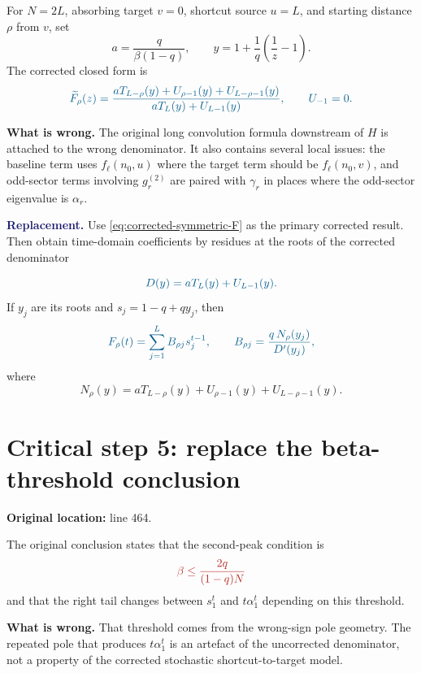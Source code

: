 \documentclass[11pt]{article}
\newcommand{\wt}{\widetilde}
\newcommand{\Original}[1]{\textcolor{BrickRed}{#1}}
\newcommand{\Corrected}[1]{\textcolor{MidnightBlue}{#1}}
\newcommand{\Issue}[1]{\par\smallskip\noindent\textbf{\textcolor{BrickRed}{What is wrong.}} #1\par}
\newcommand{\Fix}[1]{\par\smallskip\noindent\textbf{\textcolor{MidnightBlue}{Replacement.}} #1\par}
\begin{document}
For $N=2L$, absorbing target $v=0$, shortcut source $u=L$, and starting
distance $\rho$ from $v$, set
\[
  a=\frac{q}{\beta(1-q)},
  \qquad
  y=1+\frac{1}{q}\left(\frac1z-1\right).
\]
The corrected closed form is
\begin{equation}
  \Corrected{
  \wt F_\rho(z)=
  \frac{aT_{L-\rho}(y)+U_{\rho-1}(y)+U_{L-\rho-1}(y)}
  {aT_L(y)+U_{L-1}(y)},\qquad U_{-1}=0.}
  \label{eq:corrected-symmetric-F}
\end{equation}

\Issue{The original long convolution formula downstream of $H$ is attached to
the wrong denominator.  It also contains several local issues: the baseline
term uses $f_\ell(n_0,u)$ where the target term should be
$f_\ell(n_0,v)$, and odd-sector terms involving $g^{(2)}_r$ are paired with
$\gamma_r$ in places where the odd-sector eigenvalue is $\alpha_r$.}

\Fix{Use \eqref{eq:corrected-symmetric-F} as the primary corrected result.
Then obtain time-domain coefficients by residues at the roots of the corrected
denominator}
\begin{equation}
  \Corrected{D(y)=aT_L(y)+U_{L-1}(y).}
  \label{eq:corrected-D}
\end{equation}
If $y_j$ are its roots and $s_j=1-q+qy_j$, then
\begin{equation}
  \Corrected{
  F_\rho(t)=\sum_{j=1}^{L} B_{\rho j}s_j^{t-1},
  \qquad
  B_{\rho j}=\frac{q\,N_\rho(y_j)}{D'(y_j)},}
  \label{eq:residue-expansion}
\end{equation}
where
\[
  N_\rho(y)=aT_{L-\rho}(y)+U_{\rho-1}(y)+U_{L-\rho-1}(y).
\]

\section{Critical step 5: replace the beta-threshold conclusion}

\textbf{Original location:} line 464.

The original conclusion states that the second-peak condition is
\[
\Original{
  \beta\leq \frac{2q}{(1-q)N}}
\]
and that the right tail changes between $s_1^t$ and $t\alpha_1^t$ depending
on this threshold.

\Issue{That threshold comes from the wrong-sign pole geometry.  The repeated
pole that produces $t\alpha_1^t$ is an artefact of the uncorrected denominator,
not a property of the corrected stochastic shortcut-to-target model.}
\end{document}
